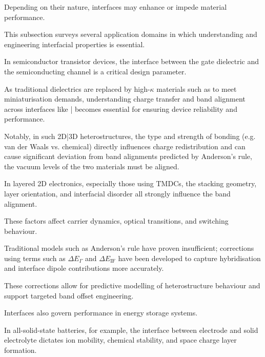 \label{para:interface_applications} %

Depending on their nature, interfaces may enhance or impede material performance.

This subsection surveys several application domains in which understanding and engineering interfacial properties is
essential.

\label{para:gate_dielectric_interface} %

In semiconductor transistor devices, the interface between the gate dielectric and the semiconducting channel is a
critical design parameter.


As traditional  dielectrics are replaced by high-$\kappa$ materials such as  to meet miniaturisation
demands, understanding charge transfer and band alignment across interfaces like |  becomes essential
for ensuring device reliability and performance.

Notably, in such 2D|3D heterostructures, the type and strength of bonding (e.g. van der Waals vs. chemical) directly
influences charge redistribution and can cause significant deviation from band alignments predicted by Anderson's rule,
the vacuum levels of the two materials must be aligned.

\label{para:tmdc_interface_band_alignment} %

In layered 2D electronics, especially those using TMDCs, the stacking geometry, layer
orientation, and interfacial disorder all strongly influence the band alignment.

These factors affect carrier dynamics, optical transitions, and switching behaviour.

Traditional models such as Anderson's rule have proven insufficient; corrections using terms such as $\Delta E_\Gamma$ and
$\Delta E_{\text{IF}}$ have been developed to capture hybridisation and interface dipole contributions more accurately.


These corrections allow for predictive modelling of heterostructure behaviour and support targeted band offset
engineering.

\label{para:energy_storage_interface} %

Interfaces also govern performance in energy storage systems.

In all-solid-state batteries, for example, the interface between electrode and solid electrolyte dictates ion mobility,
chemical stability, and space charge layer formation.

